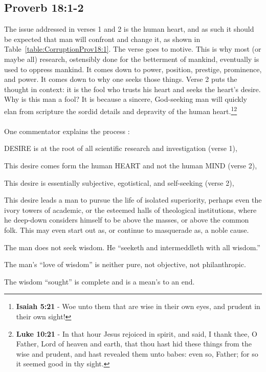 \subsection{Proverb 18:1-2}
The issue addressed in verses 1 and 2 is the human heart, and as such it should be expected that man will confront and change it, as shown in Table~\ref{table:CorruptionProv18:1}. The verse goes to motive. This is why most (or maybe all) research, ostensibly done for the betterment of mankind, eventually is used to oppress mankind. It comes down to power, position, prestige, prominence, and power. It comes down to why one seeks those things. Verse 2 puts the thought in context: it is the fool who trusts his heart and seeks the heart's desire. Why is this man a fool? It is because a sincere, God-seeking man will quickly elan from scripture the sordid details and depravity of the human heart.\footnote{\textbf{Isaiah 5:21} - Woe unto them that are wise in their own eyes, and prudent in their own sight!}\footnote{\textbf{Luke 10:21} - In that hour Jesus rejoiced in spirit, and said, I thank thee, O Father, Lord of heaven and earth, that thou hast hid these things from the wise and prudent, and hast revealed them unto babes: even so, Father; for so it seemed good in thy sight.}\\
\\
\noindent One commentator explains the process \cite{ruckman1972proverbs}:
\begin{compactenum}[1.]
    \item DESIRE is at the root of all scientific research and investigation (verse 1),
    \item This desire comes form the human HEART and not the human MIND (verse 2),
    \item This desire is essentially subjective, egotistical, and self-seeking (verse 2),
    \item This desire leads a man to pursue the life of isolated superiority, perhaps even the ivory towers of academic, or the esteemed halls of theological institutions, where he deep-down considers himself to be above the masses, or above the common folk. This may even start out as, or continue to masquerade as, a noble cause.
    \item The man does not seek wisdom. He ``seeketh and intermeddleth with all wisdom.'' 
    \item The man's ``love of wisdom'' is neither pure, not objective, not philanthropic.
    \item The wisdom ``sought'' is complete and is a mean's to an end.
\end{compactenum}

